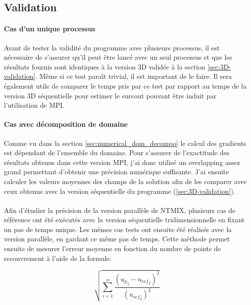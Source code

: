 \subsection{Validation}

\paragraph{Cas d'un unique processus}Avant de tester la validité du programme avec plusieurs processus, il est nécessaire de s'assurer qu'il peut être lancé avec un seul processus et que les résultats fournis sont identiques à la version 3D validée à la section \ref{sec:3D-validation}. Même si ce test paraît trivial, il est important de le faire. Il sera également utile de comparer le temps pris par ce test par rapport au temps de la version 3D séquentielle pour estimer le surcout pouvant être induit par l'utilisation de MPI.

\paragraph{Cas avec décomposition de domaine}
Comme vu dans la section \ref{sec:numerical_dom_decompo} le calcul des gradients est dépendant de l'ensemble du domaine. Pour s'assurer de l'exactitude des résultats obtenus dans cette version MPI, j'ai donc utilisé un overlapping assez grand permettant d'obtenir une précision numérique suffisante. J'ai ensuite calculer les valeurs moyennes des champs de la solution afin de les comparer avec ceux obtenus avec la version séquentielle du programme (\ref{sec:3D-validation}).


 \paragraph{}Afin d'étudier la précision de la version parallèle de NTMIX, plusieurs cas de référence ont été exécutés avec la version séquentielle tridimensionnelle en fixant un pas de temps unique. Les mêmes cas tests ont ensuite été réalisés avec la version parallèle, en gardant ce même pas de temps. Cette méthode permet ensuite de mesurer l'erreur moyenne en fonction du nombre de points de recouvrement à l'aide de la formule:

$$ \sqrt{\sum_{i=1}^{n} \frac{({u_p}_i-{u_{ref}}_i)^2}{({u_{ref}}_i)^2}} $$

